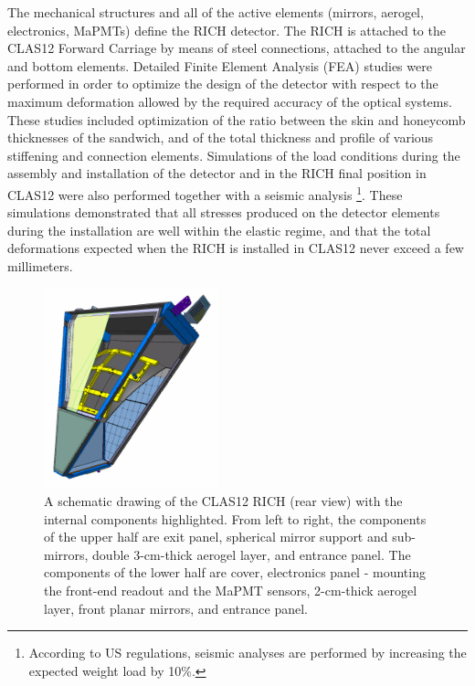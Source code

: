 \documentclass[5p,times,twocolumn]{elsarticle}
\def\MaPMT{MaPMT }
\begin{document}
The mechanical structures and all of the active elements (mirrors, aerogel, electronics, MaPMTs) define the RICH
detector. The RICH is attached to the CLAS12 Forward Carriage by means of steel connections, attached to the
angular and bottom elements. Detailed Finite Element Analysis (FEA) studies were performed in order to optimize
the design of the detector with respect to the maximum deformation allowed by the required accuracy of the optical
systems. These studies included optimization of the ratio between the skin and honeycomb thicknesses of the sandwich,
and of the total thickness and profile of various stiffening and connection elements. Simulations of the load conditions
during the assembly and installation of the detector and in the RICH final position in CLAS12 were also performed
together with a seismic analysis \footnote{According to US regulations, seismic analyses are performed by increasing
the expected weight load by 10\%.}. These simulations demonstrated that all stresses produced on the detector
elements during the installation are well within the elastic regime, and that the total deformations expected when the
RICH is installed in CLAS12 never exceed a few millimeters.

\begin{figure}
\begin{center}
\includegraphics[width=0.45\textwidth]{RICH_Overview_2.jpg}
\caption{A schematic drawing of the CLAS12 RICH (rear view) with the internal components highlighted. From left to right, the 
components of the upper half are exit panel, spherical mirror support and sub-mirrors, double 3-cm-thick aerogel
layer, and entrance panel. The components of the lower half are cover, electronics panel - mounting the front-end readout
and the \MaPMT sensors, 2-cm-thick aerogel layer, front planar mirrors, and entrance panel.}
\label{Fig:RICHexplo}
\end{center}
\end{figure}
\end{document}
